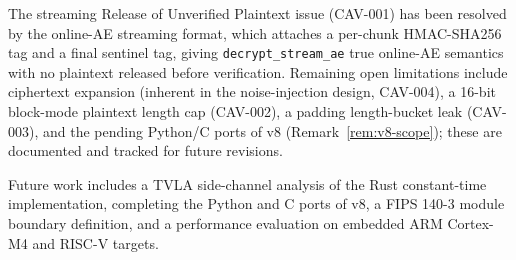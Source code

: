 \documentclass[11pt,a4paper]{article}
\begin{document}
The streaming Release of Unverified Plaintext issue (CAV-001) has been
resolved by the online-AE streaming format, which attaches a per-chunk
HMAC-SHA256 tag and a final sentinel tag, giving \texttt{decrypt\_stream\_ae}
true online-AE semantics with no plaintext released before verification.
Remaining open limitations include ciphertext expansion (inherent in the
noise-injection design, CAV-004), a 16-bit block-mode plaintext length cap
(CAV-002), a padding length-bucket leak (CAV-003), and the pending Python/C
ports of v8 (Remark~\ref{rem:v8-scope}); these are documented and tracked
for future revisions.

Future work includes a TVLA side-channel analysis of the Rust constant-time
implementation, completing the Python and C ports of v8, a FIPS 140-3 module
boundary definition, and a performance evaluation on embedded ARM Cortex-M4
and RISC-V targets.
\end{document}
